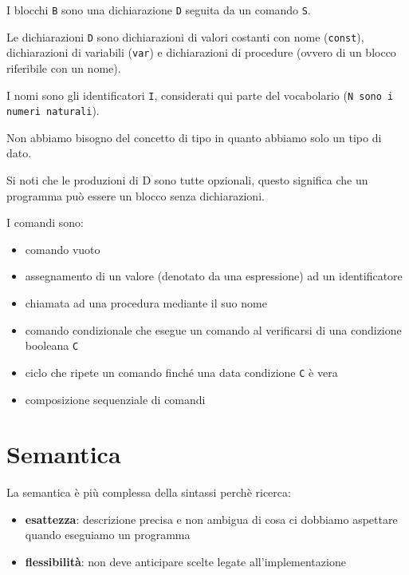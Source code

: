 \smallskip
I blocchi \texttt{B} sono una dichiarazione \texttt{D} seguita da un comando \texttt{S}.


\smallskip
Le dichiarazioni \texttt{D} sono dichiarazioni di valori costanti con nome (\texttt{const}), dichiarazioni di variabili (\texttt{var}) e dichiarazioni di procedure (ovvero di un blocco riferibile con un nome).

\smallskip
I nomi sono gli identificatori \texttt{I}, considerati qui parte del vocabolario (\texttt{N sono i numeri naturali}).

\smallskip
Non abbiamo bisogno del concetto di tipo in quanto abbiamo solo un tipo di dato. 

\smallskip
Si noti che le produzioni di D sono tutte opzionali, questo significa che un programma può essere un blocco senza dichiarazioni. 

\smallskip
I comandi sono: 
\begin{itemize}[label=$\diamond$, itemsep=\smallskipamount]
    \item comando vuoto
    \item assegnamento di un valore (denotato da una espressione) ad un identificatore
    \item chiamata ad una procedura mediante il suo nome
    \item comando condizionale che esegue un comando al verificarsi di una condizione booleana \texttt{C}
    \item ciclo che ripete un comando finché una data condizione \texttt{C} è vera
    \item composizione sequenziale di comandi
\end{itemize}


\section{Semantica}
La semantica è più complessa della sintassi perchè ricerca:
\begin{itemize}[label=$\triangleright$, itemsep=\smallskipamount]
    \item \textbf{esattezza}: descrizione precisa e non ambigua di cosa ci dobbiamo aspettare quando eseguiamo un programma
    \item \textbf{flessibilità}: non deve anticipare scelte legate all'implementazione
\end{itemize}

